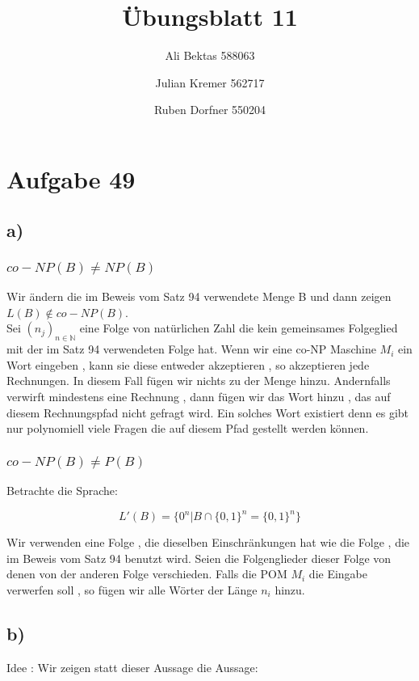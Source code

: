 \documentclass{article}
\title{Übungsblatt 11}
\author{Ali Bektas 588063 \and Julian Kremer 562717 \and Ruben Dorfner 550204}
\begin{document}
	\maketitle

	\section*{Aufgabe 49}

		\subsection*{a)}
			\subsubsection*{$co-NP(B) \neq NP(B)$}

			Wir ändern die im Beweis vom Satz 94 verwendete Menge B und dann zeigen $L(B) \notin co-NP(B)$.\\

			Sei $(n_j)_{n \in \mathbb{N}} $ eine Folge von natürlichen Zahl die kein gemeinsames Folgeglied mit der im Satz 94 verwendeten Folge hat. Wenn wir eine co-NP Maschine $M_i$ ein Wort eingeben , kann sie diese entweder akzeptieren , so akzeptieren jede Rechnungen. In diesem Fall fügen wir nichts zu der Menge hinzu. Andernfalls verwirft mindestens eine Rechnung , dann fügen wir das Wort hinzu , das auf diesem Rechnungspfad nicht gefragt wird. Ein solches Wort existiert denn es gibt nur polynomiell viele Fragen die auf diesem Pfad gestellt werden können. 

			\subsubsection*{$co-NP(B) \neq P(B)$}
				Betrachte die Sprache:

				\[
				L'(B) = \{ 0^n | B \cap \{0,1\}^n = \{0,1\}^n \}
				\]
			
				Wir verwenden eine Folge , die dieselben Einschränkungen  hat wie die Folge , die im Beweis vom Satz 94 benutzt wird. Seien die Folgenglieder dieser Folge von denen von der anderen Folge verschieden. Falls die POM $M_i$ die Eingabe verwerfen soll , so fügen wir alle Wörter der Länge $n_i$ hinzu. 
		

		\subsection*{b)}
			Idee : Wir zeigen statt dieser Aussage die Aussage:
\end{document}
